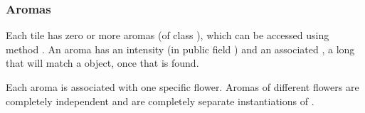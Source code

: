 \documentclass{pset}
\begin{document}
\subsubsection{Aromas}
Each tile has zero or more aromas (of class ), which can be
accessed using  method . An aroma has an
intensity (in public field ) and an associated ,
a long that will match a  object, once that  is
found.

Each aroma is associated with one specific flower. Aromas of different flowers
are completely independent and are completely separate instantiations of
.
\fi

\fi
\end{document}
